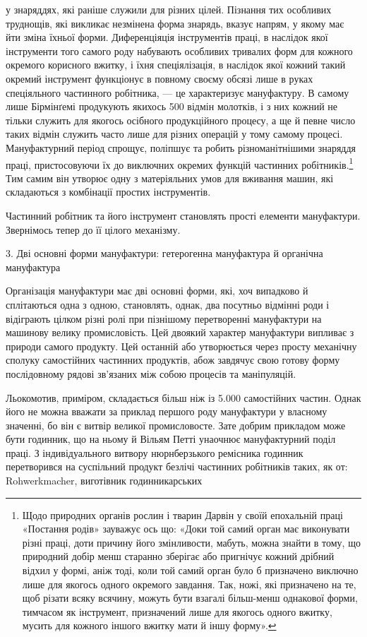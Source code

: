 \parcont{}  %
у знаряддях, які раніше служили для різних цілей. Пізнання
тих особливих труднощів, які викликає незмінена форма знарядь,
вказує напрям, у якому має йти зміна їхньої форми. Диференціяція
інструментів праці, в наслідок якої інструменти того самого роду
набувають особливих тривалих форм для кожного окремого
корисного вжитку, і їхня спеціялізація, в наслідок якої кожний
такий окремий інструмент функціонує в повному своєму обсязі
лише в руках спеціяльного частинного робітника, — це характеризує мануфактуру. В самому лише
Бірмінґемі продукують
якихось 500 відмін молотків, і з них кожний не тільки служить
для якогось осібного продукційного процесу, а ще й певне число
таких відмін служить часто лише для різних операцій у тому
самому процесі. Мануфактурний період спрощує, поліпшує та
робить різноманітнішими знаряддя праці, пристосовуючи їх до
виключних окремих функцій частинних робітників.\footnote{
Щодо природних органів рослин і тварин Дарвін у своїй епохальній праці «Постання родів» зауважує
ось що: «Доки той самий орган має виконувати різні праці, доти причину його змінливости, мабуть,
можна знайти в тому, що природний добір менш старанно зберігає або пригнічує кожний дрібний відхил у
формі, аніж тоді, коли той самий орган було б призначено виключно лише для якогось одного окремого
завдання. Так, ножі, які призначено на те, щоб різати всяку всячину,
можуть бути взагалі більш-менш однакової форми, тимчасом як інструмент, призначений лише для якогось
одного вжитку, мусить для кожного
іншого вжитку мати й іншу форму».
} Тим самим
він утворює одну з матеріяльних умов для вживання машин,
які складаються з комбінації простих інструментів.

Частинний робітник та його інструмент становлять прості
елементи мануфактури. Звернімось тепер до її цілого механізму.

3. Дві основні форми мануфактури: гетерогенна мануфактура
й органічна мануфактура

Організація мануфактури має дві основні форми, які, хоч
випадково й сплітаються одна з одною, становлять, однак, два
посутньо відмінні роди і відіграють цілком різні ролі при пізнішому перетворенні мануфактури на
машинову велику промисловість. Цей двоякий характер мануфактури випливає з природи самого продукту.
Цей останній або утворюється через просту
механічну сполуку самостійних частинних продуктів, абож
завдячує свою готову форму послідовному рядові зв’язаних між
собою процесів та маніпуляцій.

Льокомотив, приміром, складається більш ніж із 5.000 самостійних частин. Однак його не можна вважати
за приклад першого роду мануфактури у власному значенні, бо він є витвір великої промисловосте. Зате
добрим прикладом може бути годинник,
що на ньому й Вільям Петті унаочнює мануфактурний поділ праці. З індивідуального витвору
нюрнберзького ремісника годинник перетворився на суспільний продукт безлічі частинних робітників
таких, як от: Rohwerkmacher, виготівник годинникарських
\parbreak{}  %
